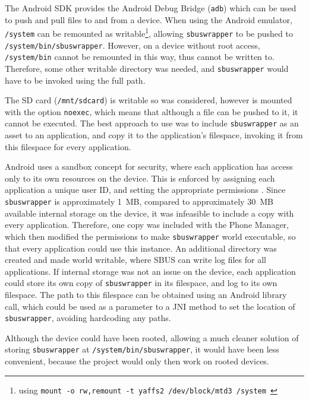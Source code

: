 \documentclass[12pt,twoside,notitlepage]{report}
\begin{document}
The Android SDK provides the Android Debug Bridge ({\tt adb}) which can be used to push and pull files to and from a device. 
When using the Android emulator, {\tt /system} can be remounted as writable\footnote{using {\tt mount -o rw,remount -t yaffs2 /dev/block/mtd3 /system }}, allowing {\tt sbuswrapper} to be pushed to {\tt /system/bin/sbuswrapper}. 
However, on a device without root access, {\tt /system/bin} cannot be remounted in this way, thus cannot be written to. 
Therefore, some other writable directory was needed, and {\tt sbuswrapper} would have to be invoked using the full path. 

The SD card ({\tt /mnt/sdcard}) is writable so was considered, however is mounted with the option {\tt noexec}, which means that although a file can be pushed to it, it cannot be executed. 
The best approach to use was to include {\tt sbuswrapper} as an asset to an application, and copy it to the application's filespace, invoking it from this filespace for every application. 

Android uses a sandbox concept for security, where each application has access only to its own resources on the device. 
This is enforced by assigning each application a unique user ID, and setting the appropriate permissions \cite{enck2009understanding}. 
Since {\tt sbuswrapper} is approximately \SI{1}{MB}, compared to approximately \SI{30}{MB} available internal storage on the device, it was infeasible to include a copy with every application. 
Therefore, one copy was included with the Phone Manager, which then modified the permissions to make {\tt sbuswrapper} world executable, so that every application could use this instance. 
An additional directory was created and made world writable, where SBUS can write log files for all applications. 
If internal storage was not an issue on the device, each application could store its own copy of {\tt sbuswrapper} in its filespace, and log to its own filespace. 
The path to this filespace can be obtained using an Android library call, which could be used as a parameter to a JNI method to set the location of {\tt sbuswrapper}, avoiding hardcoding any paths. 

Although the device could have been rooted, allowing a much cleaner solution of storing {\tt sbuswrapper} at {\tt /system/bin/sbuswrapper}, it would have been less convenient, because the project would only then work on rooted devices. 

\end{document}
